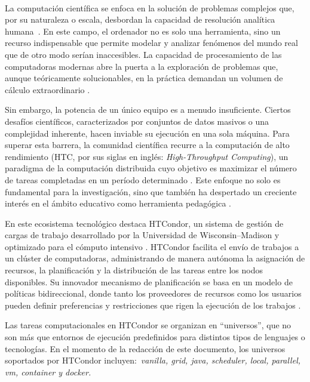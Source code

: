 \label{cap:introduccion}
\mbox{}\\

La computación científica se enfoca en la solución de problemas complejos que, por su naturaleza o escala, desbordan la capacidad de resolución analítica humana~\citep{landau01}. En este campo, el ordenador no es solo una herramienta, sino un recurso indispensable que permite modelar y analizar fenómenos del mundo real que de otro modo serían inaccesibles. La capacidad de procesamiento de las computadoras modernas abre la puerta a la exploración de problemas que, aunque teóricamente solucionables, en la práctica demandan un volumen de cálculo extraordinario \citep{landau01}.

Sin embargo, la potencia de un único equipo es a menudo insuficiente. Ciertos desafíos científicos, caracterizados por conjuntos de datos masivos o una complejidad inherente, hacen inviable su ejecución en una sola máquina. Para superar esta barrera, la comunidad científica recurre a la computación de alto rendimiento (HTC, por sus siglas en inglés: \textit{High-Throughput Computing}), un paradigma de la computación distribuida cuyo objetivo es maximizar el número de tareas completadas en un período determinado \citep{Juve2015}. Este enfoque no solo es fundamental para la investigación, sino que también ha despertado un creciente interés en el ámbito educativo como herramienta pedagógica \citep{Senol-01}.

En este ecosistema tecnológico destaca HTCondor, un sistema de gestión de cargas de trabajo desarrollado por la Universidad de Wisconsin–Madison y optimizado para el cómputo intensivo \citep{chang-01, htcondor-description}. HTCondor facilita el envío de trabajos a un clúster de computadoras, administrando de manera autónoma la asignación de recursos, la planificación y la distribución de las tareas entre los nodos disponibles. Su innovador mecanismo de planificación se basa en un modelo de políticas bidireccional, donde tanto los proveedores de recursos como los usuarios pueden definir preferencias y restricciones que rigen la ejecución de los trabajos \citep{htcondor-description}.

Las tareas computacionales en HTCondor se organizan en ``universos'', que no son más que entornos de ejecución predefinidos para distintos tipos de lenguajes o tecnologías. En el momento de la redacción de este documento, los universos soportados por HTCondor incluyen:~\textit{vanilla, grid, java, scheduler, local, parallel, vm, container y docker.}
